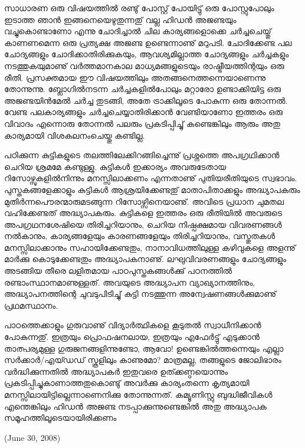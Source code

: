 ﻿
\vskip 2pt

സാധാരണ ഒരു വിഷയത്തില്‍ രണ്ടു് പോസ്റ്റ് പോയിട്ടു് ഒരു പോസ്റ്റുപോലും ഇടാത്ത ഞാന്‍ ഇങ്ങനെയെഴുതുന്നതു് 
വല്ല ഹിഡന്‍ അജണ്ടയും വച്ചുകൊണ്ടാണോ എന്നു ചോദിച്ചാല്‍ ചില കാര്യങ്ങളൊക്കെ ചര്‍ച്ചചെയ്തു് കാണണമെന്ന 
ഒരു പ്രത്യക്ഷ അജണ്ട ഉണ്ടെന്നാണു് മറുപടി. ചോദിക്കേണ്ട പല ചോദ്യങ്ങളും ചോദിക്കാതിരിക്കുകയും, ആവശ്യമില്ലാത്ത 
ചോദ്യങ്ങളും ചര്‍ച്ചകളും നടത്തുകയുമാണു് വര്‍ത്തമാനകാല മാധ്യമങ്ങളുടെയും രാഷ്ട്രീയത്തിന്റയും ഒരു രീതി. 
പ്രസക്തമായ ഈ വിഷയത്തിലും അതങ്ങനെത്തന്നെയാണെന്നു തോന്നുന്നു. ബ്ലോഗില്‍നടന്ന ചര്‍ച്ചകളില്‍പോലും 
മറ്റാരോ ഉണ്ടാക്കിയിട്ട ഒരു അജണ്ടയിന്‍മേല്‍ ചര്‍ച്ച തുടങ്ങി, അതേ ട്രാക്കിലൂടെ പോകുന്ന ഒരു തോന്നല്‍. വേണ്ട 
പലകാര്യങ്ങളും ചര്‍ച്ചചെയ്യാതിരിക്കാന്‍ വേണ്ടിയാണോ ഇത്തരം ഒരു വിവാദം എന്നൊരു തോന്നല്‍ പലരും 
പ്രകടിപ്പിച്ചു് കണ്ടെങ്കിലും ആരും അതു കാര്യമായി വിശകലനംചെയ്തു കണ്ടില്ല.

പഠിക്കുന്ന കുട്ടികളുടെ തലത്തിലേക്കിറങ്ങിച്ചെന്നു് പ്രശ്നത്തെ അപഗ്രഥിക്കാന്‍ ചെറിയ ശ്രമമേ കണ്ടുള്ളു. കുട്ടികള്‍ 
ഇക്കാര്യം അവരുടേതായ റിസോഴ്സുകളില്‍നിന്നും മനസ്സിലാക്കണം എന്നതാണു് പുതിയരീതിയുടെ സ്വഭാവം. 
പുസ്തകങ്ങളേക്കാളും കുട്ടികള്‍ ആശ്രയിക്കേണ്ടതു് മാതാപിതാക്കളും അദ്ധ്യാപകരും മുതിര്‍ന്നപൌരന്മാരുമടങ്ങുന്ന 
റിസോഴ്സിനെയാണു്. അവിടെ പ്രധാന ചുമതല വഹിക്കേണ്ടത് അദ്ധ്യാപകരും. കുട്ടികളെ ഇത്തരം ഒരു രീതിയില്‍ 
അവരുടെ അപഗ്രഥനശേഷിയെ തിരിച്ചറിയാനും, ചെറിയ നിഷ്പക്ഷമായ വിവരണങ്ങള്‍ നല്‍കാനും, 
കാര്യങ്ങളേയും കാരണങ്ങളേയും തിരിച്ചറിയാനും, വസ്തുതകള്‍ മനസ്സിലാക്കാനും സഹായിക്കേണ്ടതും, നാനാവിധത്തിലുള്ള 
കഴിവുകളെ അളന്നു് മാര്‍ക്കു കൊടുക്കേണ്ടതും അദ്ധ്യാപകനാണു്. ലഘുവിവരണങ്ങളും ചോദ്യങ്ങളും അടങ്ങിയ തീരെ 
ലളിതമായ പാഠപുസ്തകങ്ങള്‍ക്കു് പഠനത്തില്‍ രണ്ടാംസ്ഥാനമാണുള്ളത്. അവയുടെ അദ്ധ്യാപന വ്യാഖ്യാനത്തിനും, 
അദ്ധ്യാപനത്തിന്റെ ചുവടുപിടിച്ചു് കുട്ടി നടത്തുന്ന അന്വേഷണങ്ങള്‍ക്കുമാണു് പ്രഥമസ്ഥാനം.

പാഠത്തെക്കാളും ഗുരുവാണു് വിദ്യാര്‍ത്ഥികളെ കൂടുതല്‍ സ്വാധീനിക്കാന്‍ പോകുന്നതു്. ഇത്രയും പ്രൊഫഷനലായ, 
ഇത്രയും എഫേര്‍ട്ടു് എടുക്കാന്‍ താത്പര്യമുള്ള ഗുരുജനങ്ങളിന്നുണ്ടോ, ആവോ! ഉണ്ടെങ്കില്‍ത്തന്നെയും എല്ലാ 
സര്‍ക്കാര്‍/എയ്ഡഡ് സ്കൂളിലും കാണുമോ? മാത്രമല്ല, തങ്ങളുടെ ജോലിഭാരം വര്‍ദ്ധിക്കുന്നതില്‍ അദ്ധ്യാപകര്‍ 
ഇതുവരെ ഉത്ക്കണ്ഠയൊന്നും പ്രകടിപ്പിച്ചുകാണാത്തതുകൊണ്ടു് അവര്‍ക്കു കാര്യംതന്നെ കൃത്യമായി 
മനസ്സിലായിട്ടില്ലെന്നാണെനിക്കു തോന്നുന്നത്. കമ്യൂണിസ്റ്റു ബുദ്ധിജീവികള്‍ എന്തെങ്കിലും ഹിഡന്‍ അജണ്ട 
നടപ്പാക്കുന്നുണ്ടെങ്കില്‍ അതു അദ്ധ്യാപക സമൂഹത്തിലൂടെയായിരിക്കണം

\begin{flushright}(June 30, 2008)\end{flushright}

